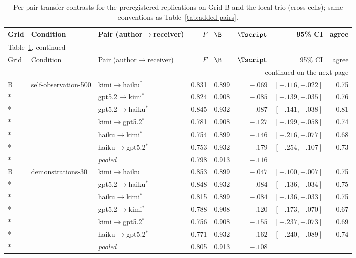 {\scriptsize\renewcommand{\arraystretch}{0.9}
\begin{longtable}{lllrlrrr}
\caption{Per-pair transfer contrasts for the preregistered replications on Grid B and the local trio (cross cells); same conventions as Table~\ref{tab:added-pairs}.}\label{tab:added-pairs-repl} \\
\toprule
Grid & Condition & Pair (author$\to$receiver) & $F$ & $\B$ & $\Tscript$ & 95\% CI & agree \\
\midrule
\endfirsthead
\multicolumn{8}{l}{\footnotesize Table~\ref{tab:added-pairs-repl}, continued} \\
\toprule
Grid & Condition & Pair (author$\to$receiver) & $F$ & $\B$ & $\Tscript$ & 95\% CI & agree \\
\midrule
\endhead
\midrule
\multicolumn{8}{r}{\footnotesize continued on the next page} \\
\endfoot
\bottomrule
\endlastfoot
B & self-observation-500 & kimi$\to$haiku$^{*}$ & 0.831 & 0.899 & $-.069$ & $[-.116,-.022]$ & 0.75 \\*
 &  & gpt5.2$\to$kimi$^{*}$ & 0.824 & 0.908 & $-.085$ & $[-.139,-.035]$ & 0.76 \\*
 &  & gpt5.2$\to$haiku$^{*}$ & 0.845 & 0.932 & $-.087$ & $[-.141,-.038]$ & 0.81 \\*
 &  & kimi$\to$gpt5.2$^{*}$ & 0.781 & 0.908 & $-.127$ & $[-.199,-.058]$ & 0.74 \\*
 &  & haiku$\to$kimi$^{*}$ & 0.754 & 0.899 & $-.146$ & $[-.216,-.077]$ & 0.68 \\*
 &  & haiku$\to$gpt5.2$^{*}$ & 0.753 & 0.932 & $-.179$ & $[-.254,-.107]$ & 0.73 \\*
 & & \emph{pooled} & 0.798 & 0.913 & $-.116$ & & \\
\addlinespace
B & demonstrations-30 & kimi$\to$haiku & 0.853 & 0.899 & $-.047$ & $[-.100,+.007]$ & 0.75 \\*
 &  & gpt5.2$\to$haiku$^{*}$ & 0.848 & 0.932 & $-.084$ & $[-.136,-.034]$ & 0.75 \\*
 &  & haiku$\to$kimi$^{*}$ & 0.815 & 0.899 & $-.084$ & $[-.136,-.033]$ & 0.75 \\*
 &  & gpt5.2$\to$kimi$^{*}$ & 0.788 & 0.908 & $-.120$ & $[-.173,-.070]$ & 0.67 \\*
 &  & kimi$\to$gpt5.2$^{*}$ & 0.756 & 0.908 & $-.155$ & $[-.237,-.073]$ & 0.69 \\*
 &  & haiku$\to$gpt5.2$^{*}$ & 0.771 & 0.932 & $-.162$ & $[-.240,-.089]$ & 0.74 \\*
 & & \emph{pooled} & 0.805 & 0.913 & $-.108$ & & \\

\end{longtable}}
